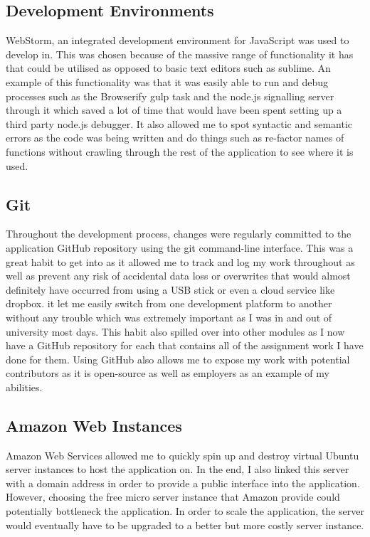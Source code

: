 \documentclass[]{report}
\begin{document}
			\subsection{Development Environments}
			WebStorm, an integrated development environment for JavaScript was used to develop in. This was chosen because of the massive range of functionality it has that could be utilised as opposed to basic text editors such as sublime. An example of this functionality was that it was easily able to run and  debug processes such as the Browserify gulp task and the node.js signalling server through it which saved a lot of time that would have been spent setting up a third party node.js debugger. It also allowed me to spot syntactic and semantic errors as the code was being written and do things such as re-factor names of functions without crawling through the rest of the application to see where it is used.
			
			\subsection{Git}
			Throughout the development process, changes were regularly committed to the application GitHub repository using the git command-line interface. This was a great habit to get into as it allowed me to track and log my work throughout as well as prevent any risk of accidental data loss or overwrites that would almost definitely have occurred from using a USB stick or even a cloud service like dropbox. it let me easily switch from one development platform to another without any trouble which was extremely important as I was in and out of university most days. This habit also spilled over into other modules as I now have a GitHub repository for each that contains all of the assignment work I have done for them. Using GitHub also allows me to expose my work with potential contributors as it is open-source as well as employers as an example of my abilities. 
			
			\subsection{Amazon Web Instances}
			Amazon Web Services allowed me to quickly spin up and destroy virtual Ubuntu server instances to host the application on. In the end, I also linked this server with a domain address in order to provide a public interface into the application. However, choosing the free micro server instance that Amazon provide could potentially bottleneck the application. In order to scale the application, the server would eventually have to be upgraded to a better but more costly server instance.			
\end{document}
